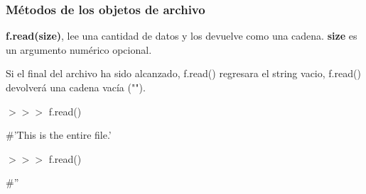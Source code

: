 \documentclass{beamer}
\begin{document}
\begin{frame}
\frametitle{M\'etodos de los objetos de archivo}

\textbf{f.read(size)}, lee una cantidad de datos y los devuelve como una cadena. \textbf{size} es un argumento num\'erico opcional.

\hfill
Si el final del archivo ha sido alcanzado, f.read() regresara el string vacio, f.read() devolver\'a una cadena vac\'ia ("").

\hfill

$>>>$ f.read()

#'This is the entire file.\n'

$>>>$ f.read()

#''

\end{frame}
\end{document}
